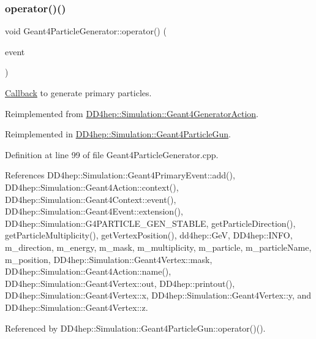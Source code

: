 \subsubsection{\texorpdfstring{operator()()}{operator()()}}
{\footnotesize\ttfamily void Geant4\+Particle\+Generator\+::operator() (\begin{DoxyParamCaption}\item[{G4\+Event $\ast$}]{event }\end{DoxyParamCaption})\hspace{0.3cm}{\ttfamily [virtual]}}



\hyperlink{class_d_d4hep_1_1_callback}{Callback} to generate primary particles. 



Reimplemented from \hyperlink{class_d_d4hep_1_1_simulation_1_1_geant4_generator_action_ac5a1d2335a19e3f9d555081199e01801}{D\+D4hep\+::\+Simulation\+::\+Geant4\+Generator\+Action}.



Reimplemented in \hyperlink{class_d_d4hep_1_1_simulation_1_1_geant4_particle_gun_a4e68905424d21f2386d24d3cbaf795f1}{D\+D4hep\+::\+Simulation\+::\+Geant4\+Particle\+Gun}.



Definition at line 99 of file Geant4\+Particle\+Generator.\+cpp.



References D\+D4hep\+::\+Simulation\+::\+Geant4\+Primary\+Event\+::add(), D\+D4hep\+::\+Simulation\+::\+Geant4\+Action\+::context(), D\+D4hep\+::\+Simulation\+::\+Geant4\+Context\+::event(), D\+D4hep\+::\+Simulation\+::\+Geant4\+Event\+::extension(), D\+D4hep\+::\+Simulation\+::\+G4\+P\+A\+R\+T\+I\+C\+L\+E\+\_\+\+G\+E\+N\+\_\+\+S\+T\+A\+B\+LE, get\+Particle\+Direction(), get\+Particle\+Multiplicity(), get\+Vertex\+Position(), dd4hep\+::\+GeV, D\+D4hep\+::\+I\+N\+FO, m\+\_\+direction, m\+\_\+energy, m\+\_\+mask, m\+\_\+multiplicity, m\+\_\+particle, m\+\_\+particle\+Name, m\+\_\+position, D\+D4hep\+::\+Simulation\+::\+Geant4\+Vertex\+::mask, D\+D4hep\+::\+Simulation\+::\+Geant4\+Action\+::name(), D\+D4hep\+::\+Simulation\+::\+Geant4\+Vertex\+::out, D\+D4hep\+::printout(), D\+D4hep\+::\+Simulation\+::\+Geant4\+Vertex\+::x, D\+D4hep\+::\+Simulation\+::\+Geant4\+Vertex\+::y, and D\+D4hep\+::\+Simulation\+::\+Geant4\+Vertex\+::z.



Referenced by D\+D4hep\+::\+Simulation\+::\+Geant4\+Particle\+Gun\+::operator()().

